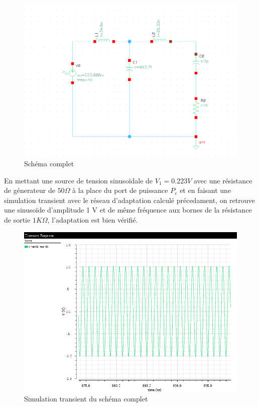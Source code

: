 \documentclass[a4paper]{article}
\begin{document}
\fi

\begin{figure}[!htb]
\begin{center}
  \includegraphics[width=0.7\linewidth]{V-Adaptation.png}
  \caption{Sch\'ema complet}
\end{center}
\end{figure}

En mettant une source de tension sinuso\"idale de $V_1 = 0.223 V$ avec une r\'esistance de g\'enerateur de $50 \Omega$ \`a la place du port de
puissance $P_e$ et en faisant une simulation transient avec le r\'eseau d'adaptation calcul\'e pr\'ecedament, on retrouve une sinuso\"ide d'amplitude
1 V et de m\^eme fr\'equence aux bornes de la r\'esistance de sortie $1 K\Omega$, l'adaptation est bien v\'erifi\'e.

\begin{figure}[!htb]
\begin{center}
  \includegraphics[width=0.7\linewidth]{V-Adaptation-sim.png}
  \caption{Simulation transient du sch\'ema complet}
\end{center}
\end{figure}

\clearpage
\end{document}
